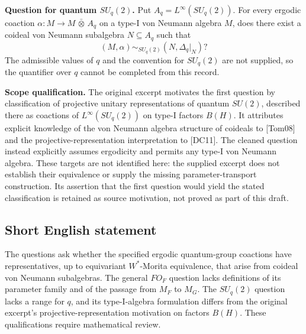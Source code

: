 \documentclass[11pt]{article}
\begin{document}
\textbf{Question for quantum \(SU_q(2)\).} Put \(A_q=L^\infty(SU_q(2))\). For every ergodic coaction \(\alpha:M\to M\,\bar\otimes\,A_q\) on a type-I von Neumann algebra \(M\), does there exist a coideal von Neumann subalgebra \(N\subseteq A_q\) such that
\[
(M,\alpha)\sim_{SU_q(2)}(N,\Delta_q|_N)?
\]
The admissible values of \(q\) and the convention for \(SU_q(2)\) are not supplied, so the quantifier over \(q\) cannot be completed from this record.

\textbf{Scope qualification.} The original excerpt motivates the first question by classification of projective unitary representations of quantum \(SU(2)\), described there as coactions of \(L^\infty(SU_q(2))\) on type-I factors \(B(H)\). It attributes explicit knowledge of the von Neumann algebra structure of coideals to [Tom08] and the projective-representation interpretation to [DC11]. The cleaned question instead explicitly assumes ergodicity and permits any type-I von Neumann algebra. These targets are not identified here: the supplied excerpt does not establish their equivalence or supply the missing parameter-transport construction. Its assertion that the first question would yield the stated classification is retained as source motivation, not proved as part of this draft.
\subsection{Short English statement}
The questions ask whether the specified ergodic quantum-group coactions have representatives, up to equivariant \(W^*\)-Morita equivalence, that arise from coideal von Neumann subalgebras. The general \(FO_F\) question lacks definitions of its parameter family and of the passage from \(M_F\) to \(M_G\). The \(SU_q(2)\) question lacks a range for \(q\), and its type-I-algebra formulation differs from the original excerpt's projective-representation motivation on factors \(B(H)\). These qualifications require mathematical review.
\end{document}

